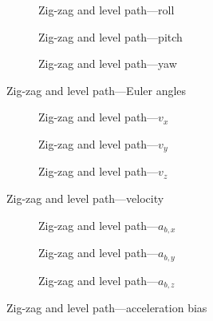 \begin{figure}[H]
    \centering
    \begin{subfigure}{0.3\textwidth}
        
        \caption{Zig-zag and level path---roll}
    \end{subfigure}
    \hfill
    \begin{subfigure}{0.3\textwidth}
        
        \caption{Zig-zag and level path---pitch}
    \end{subfigure}
    \hfill
    \begin{subfigure}{0.3\textwidth}
        
        \caption{Zig-zag and level path---yaw}
    \end{subfigure}
    \caption{Zig-zag and level path---Euler angles}\label{fig:zig-zag-level-euler}
\end{figure}

\begin{figure}[H]
    \centering
    \begin{subfigure}{0.3\textwidth}
        
        \caption{Zig-zag and level path---$v_x$}
    \end{subfigure}
    \hfill
    \begin{subfigure}{0.3\textwidth}
        
        \caption{Zig-zag and level path---$v_y$}
    \end{subfigure}
    \hfill
    \begin{subfigure}{0.3\textwidth}
        
        \caption{Zig-zag and level path---$v_z$}
    \end{subfigure}
    \caption{Zig-zag and level path---velocity}\label{fig:zig-zag-level-vel}
\end{figure}

\begin{figure}[H]
    \centering
    \begin{subfigure}{0.3\textwidth}
        
        \caption{Zig-zag and level path---$a_{b,x}$}
    \end{subfigure}
    \hfill
    \begin{subfigure}{0.3\textwidth}
        
        \caption{Zig-zag and level path---$a_{b,y}$}
    \end{subfigure}
    \hfill
    \begin{subfigure}{0.3\textwidth}
        
        \caption{Zig-zag and level path---$a_{b,z}$}
    \end{subfigure}
    \caption{Zig-zag and level path---acceleration bias}\label{fig:zig-zag-level-abias}
\end{figure}

